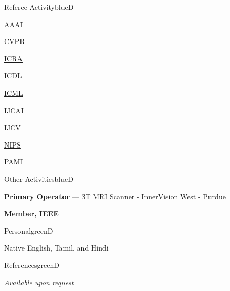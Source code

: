 \documentclass[a4paper]{article}
\def\item{\addtocounter{enumi}{-2}\oldItem}
\begin{document}

\begin{region}{Referee Activity}{blueD}
\item
  \vspace*{-3ex}
  \begin{multicols}{10}
    \begin{compactitem}
    \item \href{http://www.aaai.org/home.html}{AAAI}
    \item \href{http://www.pamitc.org/cvpr14/}{CVPR}
    \item \href{http://www.icra2014.com/}{ICRA}
    \item \href{http://www.icdl-epirob.org/}{ICDL}
    \item \href{http://www.icml.cc/}{ICML}
    \item \href{http://ijcai-16.org/}{IJCAI}
    \item \href{http://link.springer.com/journal/11263}{IJCV}
    \item \href{http://nips.cc/}{NIPS}
    \item \href{http://www.computer.org/portal/web/tpami}{PAMI}
    \end{compactitem}
  \end{multicols}
  \vspace*{-3ex}
\end{region}


\begin{region}{Other Activities}{blueD}
\item \textbf{Primary Operator} --- 3T MRI Scanner - InnerVision West - Purdue
\item \textbf{Member, IEEE} %
\end{region}

\begin{region}{Personal}{greenD}
\item Native English, Tamil, and Hindi
\end{region}

\begin{region}{References}{greenD}
\item \textsl{Available upon request}
\end{region}
\end{document}
